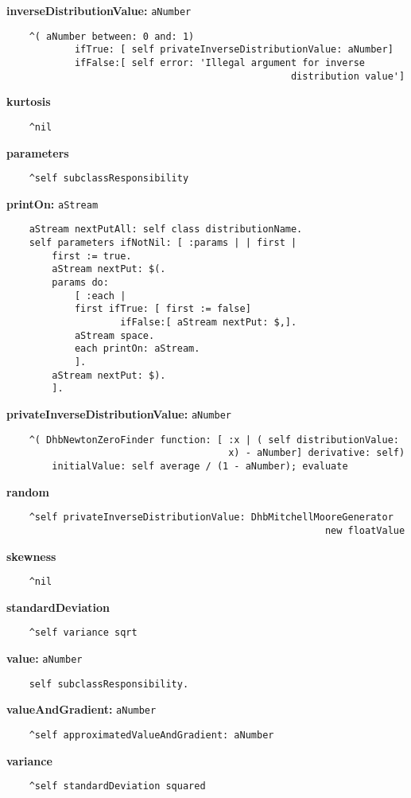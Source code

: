 {\bf inverseDistributionValue:} {\tt aNumber}
\begin{verbatim}
    ^( aNumber between: 0 and: 1)
            ifTrue: [ self privateInverseDistributionValue: aNumber]
            ifFalse:[ self error: 'Illegal argument for inverse 
                                                  distribution value']

\end{verbatim}
{\bf kurtosis}
\begin{verbatim}
    ^nil

\end{verbatim}
{\bf parameters}
\begin{verbatim}
    ^self subclassResponsibility

\end{verbatim}
{\bf printOn:} {\tt aStream}
\begin{verbatim}
    aStream nextPutAll: self class distributionName.
    self parameters ifNotNil: [ :params | | first |
        first := true.
        aStream nextPut: $(.
        params do:
            [ :each |
            first ifTrue: [ first := false]
                    ifFalse:[ aStream nextPut: $,].
            aStream space.
            each printOn: aStream.
            ].
        aStream nextPut: $).
        ].

\end{verbatim}
{\bf privateInverseDistributionValue:} {\tt aNumber}
\begin{verbatim}
    ^( DhbNewtonZeroFinder function: [ :x | ( self distributionValue: 
                                       x) - aNumber] derivative: self)
        initialValue: self average / (1 - aNumber); evaluate

\end{verbatim}
{\bf random}
\begin{verbatim}
    ^self privateInverseDistributionValue: DhbMitchellMooreGenerator 
                                                        new floatValue

\end{verbatim}
{\bf skewness}
\begin{verbatim}
    ^nil

\end{verbatim}
{\bf standardDeviation}
\begin{verbatim}
    ^self variance sqrt

\end{verbatim}
{\bf value:} {\tt aNumber}
\begin{verbatim}
    self subclassResponsibility.

\end{verbatim}
{\bf valueAndGradient:} {\tt aNumber}
\begin{verbatim}
    ^self approximatedValueAndGradient: aNumber

\end{verbatim}
{\bf variance}
\begin{verbatim}
    ^self standardDeviation squared

\end{verbatim}

